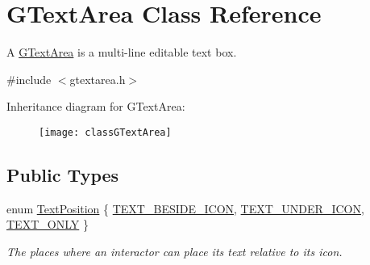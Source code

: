 \hypertarget{classGTextArea}{}\section{G\+Text\+Area Class Reference}
\label{classGTextArea}


A \mbox{\hyperlink{classGTextArea}{G\+Text\+Area}} is a multi-\/line editable text box.  




{\ttfamily \#include $<$gtextarea.\+h$>$}

Inheritance diagram for G\+Text\+Area\+:\begin{figure}[H]
\begin{center}
\leavevmode
\texttt{[image: classGTextArea]}
\end{center}
\end{figure}
\subsection*{Public Types}
\begin{DoxyCompactItemize}
\item 
enum \mbox{\hyperlink{classGInteractor_a8e0d441725a81d2bbdebbea09078260e}{Text\+Position}} \{ \mbox{\hyperlink{classGInteractor_a8e0d441725a81d2bbdebbea09078260ea4cd6f2e7d5a08d6f4dc052df2358f774}{T\+E\+X\+T\+\_\+\+B\+E\+S\+I\+D\+E\+\_\+\+I\+C\+ON}}, 
\mbox{\hyperlink{classGInteractor_a8e0d441725a81d2bbdebbea09078260eaa88490f63d8de68d44c83bdb2ecde3b3}{T\+E\+X\+T\+\_\+\+U\+N\+D\+E\+R\+\_\+\+I\+C\+ON}}, 
\mbox{\hyperlink{classGInteractor_a8e0d441725a81d2bbdebbea09078260ea39a6f388a30ac4fefb6eb13e846bc9f2}{T\+E\+X\+T\+\_\+\+O\+N\+LY}}
 \}
\begin{DoxyCompactList}\small\item\em The places where an interactor can place its text relative to its icon. \end{DoxyCompactList}\end{DoxyCompactItemize}

